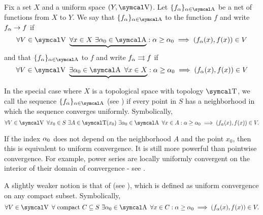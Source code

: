 \begin{definition}\label{def:function_net_convergence}
  Fix a set \( X \) and a uniform space \( (Y, \CV) \). Let \( \{ f_\al \}_{\al \in \CA} \) be a net of functions from \( X \) to \( Y \). We say that \( \{ f_\al \}_{\al \in \CA} \)  to the function \( f \) and write \( f_\alpha \to f \) if
  \begin{equation}\label{def:function_net_convergence/pointwise}
    \forall V \in \CV \ \underbrace{\forall x \in X \ \exists \al_0 \in \CA} : \al \geq \al_0 \implies (f_\al(x), f(x)) \in V
  \end{equation}
  and that \( \{ f_\al \}_{\al \in \CA} \)  to \( f \) and write \( f_\alpha \rightrightarrows f \) if
  \begin{equation}\label{def:function_net_convergence/uniform}
    \forall V \in \CV \ \underbrace{\exists \al_0 \in \CA \ \forall x \in X} : \al \geq \al_0 \implies (f_\al(x), f(x)) \in V
  \end{equation}

  In the special case where \( X \) is a topological space with topology \( \CT \), we call the sequence \( \{ f_\al \}_{\al \in \CA} \)  (see \cite{ProofWiki:locally_uniform_convergence}) if every point in \( S \) has a neighborhood in which the sequence converges uniformly. Symbolically,
  \begin{equation}\label{def:function_net_convergence/locally_uniform}
    \forall V \in \CV \ \forall x_0 \in S \ \exists A \in \CT(x_0) \ \exists \al_0 \in \CA \ \forall x \in A : \al \geq \al_0 \implies (f_\al(x), f(x)) \in V.
  \end{equation}

  If the index \( \alpha_0 \) does not depend on the neighborhood \( A \) and the point \( x_0 \), then this is equivalent to uniform convergence. It is still more powerful than pointwise convergence. For example, power series are locally uniformly convergent on the interior of their domain of convergence - see .

  A slightly weaker notion is that of  (see \cite{ProofWiki:compact_convergence}), which is defined as uniform convergence on any compact subset. Symbolically,
  \begin{equation}\label{def:function_net_convergence/compact}
    \forall V \in \CV \ \forall \text{ compact } C \subseteq S \ \exists \al_0 \in \CA \ \forall x \in C : \al \geq \al_0 \implies (f_\al(x), f(x)) \in V.
  \end{equation}
\end{definition}

